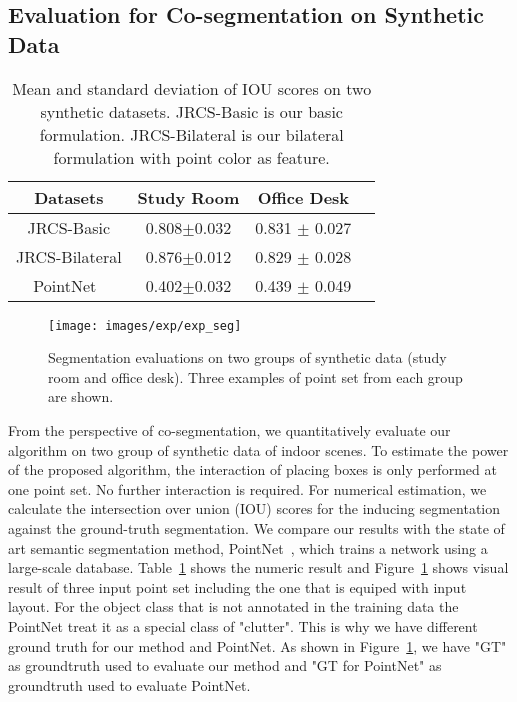 \subsection{Evaluation for Co-segmentation on Synthetic Data}
\begin{table}
	\centering
	\caption{Mean and standard deviation of IOU scores on two synthetic datasets. JRCS-Basic is our basic formulation. JRCS-Bilateral  is our bilateral formulation with point color as feature.  }
	\begin{tabular}{c c c c}
		Datasets &  Study Room & Office Desk \\
		\hline
		JRCS-Basic & 0.808$\pm$0.032 & 0.831 $\pm$ 0.027\\   
		JRCS-Bilateral & 0.876$\pm$0.012 & 0.829 $\pm$ 0.028\\
		PointNet~\cite{qi2016pointnet} & 0.402$\pm$0.032 &  0.439 $\pm$ 0.049\\
	\end{tabular}
	\label{tab:seg}
\end{table}
\begin{figure}[htb]
	\centering
	\texttt{[image: images/exp/exp\_seg]}
	\caption{\label{fig:seg} Segmentation evaluations on two groups of synthetic data (study room and office desk). Three examples of point set from each group are shown.}
\end{figure}
%
From the perspective of co-segmentation, we quantitatively evaluate our algorithm on two group of synthetic data of indoor scenes. 
%
To estimate the power of the proposed algorithm, the interaction of placing boxes is only performed at one point set. No further interaction is required. 
%
For numerical estimation, we calculate the intersection over union (IOU) scores for the inducing segmentation against the ground-truth segmentation.
% 
We compare our results with the state of art semantic segmentation method, PointNet~\cite{qi2016pointnet}, which trains a network using a large-scale database. 
%
Table~\ref{tab:seg} shows the numeric result and Figure~\ref{fig:seg} shows visual result of three input point set including the one that is equiped with input layout.
For the object class that is not annotated in the training data the PointNet treat it as a special class of "clutter". This is why we have different ground truth for our method and PointNet. As shown in Figure~\ref{fig:seg}, we have "GT" as groundtruth used to evaluate our method and "GT for PointNet" as groundtruth used to evaluate PointNet. 
